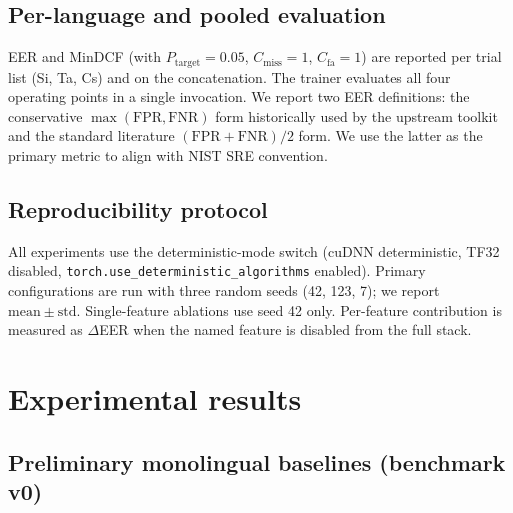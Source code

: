 \documentclass[11pt,a4paper]{article}
\begin{document}
\subsection{Per-language and pooled evaluation}
\label{sec:method:eval}

EER and MinDCF (with $P_\mathrm{target}=0.05$, $C_\mathrm{miss}=1$,
$C_\mathrm{fa}=1$) are reported per trial list (Si, Ta, Cs) and on
the concatenation. The trainer evaluates all four operating points in
a single invocation. We report two EER definitions: the conservative
$\max(\mathrm{FPR},\mathrm{FNR})$ form historically used by the
upstream toolkit and the standard literature
$(\mathrm{FPR}+\mathrm{FNR})/2$ form. We use the latter as the
primary metric to align with NIST SRE convention.

\subsection{Reproducibility protocol}
\label{sec:method:repro}

All experiments use the deterministic-mode switch
(cuDNN deterministic, TF32 disabled,
\texttt{torch.use\_deterministic\_algorithms} enabled). Primary
configurations are run with three random seeds (42, 123, 7); we
report $\mathrm{mean} \pm \mathrm{std}$. Single-feature ablations
use seed 42 only. Per-feature contribution is measured as $\Delta$EER
when the named feature is disabled from the full stack.

\section{Experimental results}
\label{sec:experiments}

\subsection{Preliminary monolingual baselines (benchmark v0)}
\label{sec:exp:prelim}

\end{document}
